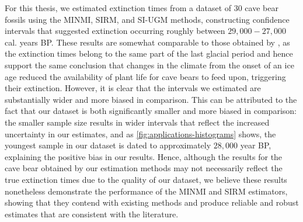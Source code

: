 For this thesis, we estimated extinction times from a dataset of 30 cave bear fossils using the MINMI, SIRM, and SI-UGM methods, constructing confidence intervals that suggested extinction occurring roughly between $29,000 - 27,000$ cal. years BP. These results are somewhat comparable to those obtained by \citet{Baca2016}, as the extinction times belong to the same part of the last glacial period and hence support the same conclusion that changes in the climate from the onset of an ice age reduced the availability of plant life for cave bears to feed upon, triggering their extinction. However, it is clear that the intervals we estimated are substantially wider and more biased in comparison. This can be attributed to the fact that our dataset is both significantly smaller and  more biased in comparison: the smaller sample size results in wider intervals that reflect the increased uncertainty in our estimates, and as \autoref{fig:applications-histograms} shows, the youngest sample in our dataset is dated to approximately $28,000$ year BP, explaining the positive bias in our results. Hence, although the results for the cave bear obtained by our estimation methods may not necessarily reflect the true extinction times due to the quality of our dataset, we believe these results nonetheless demonstrate the performance of the MINMI and SIRM estimators, showing that they contend with existing methods and produce reliable and robust estimates that are consistent with the literature.